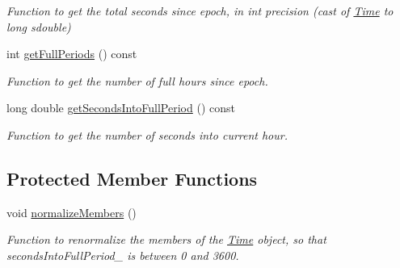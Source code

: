 \begin{DoxyCompactItemize}
\begin{DoxyCompactList}\small\item\em Function to get the total seconds since epoch, in int precision (cast of \hyperlink{classtudat_1_1Time}{Time} to long sdouble) \end{DoxyCompactList}\item 
int \hyperlink{classtudat_1_1Time_ac978db724b5f2a3ad22fa5793dedfcf9}{get\+Full\+Periods} () const 
\begin{DoxyCompactList}\small\item\em Function to get the number of full hours since epoch. \end{DoxyCompactList}\item 
long double \hyperlink{classtudat_1_1Time_a9a754aa50dabf8d70503d479bcf7606d}{get\+Seconds\+Into\+Full\+Period} () const 
\begin{DoxyCompactList}\small\item\em Function to get the number of seconds into current hour. \end{DoxyCompactList}\end{DoxyCompactItemize}
\subsection*{Protected Member Functions}
\begin{DoxyCompactItemize}
\item 
void \hyperlink{classtudat_1_1Time_a647a6b72c532bbd11b4e819ec15b28f0}{normalize\+Members} ()\hypertarget{classtudat_1_1Time_a647a6b72c532bbd11b4e819ec15b28f0}{}\label{classtudat_1_1Time_a647a6b72c532bbd11b4e819ec15b28f0}

\begin{DoxyCompactList}\small\item\em Function to renormalize the members of the \hyperlink{classtudat_1_1Time}{Time} object, so that seconds\+Into\+Full\+Period\+\_\+ is between 0 and 3600. \end{DoxyCompactList}\end{DoxyCompactItemize}
